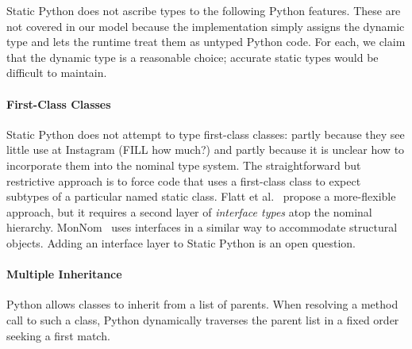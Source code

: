 \documentclass[english,cleveref,submission]{programming}
\newcommand{\SP}{Static Python}
\begin{document}
\SP{} does not ascribe types to the following Python features.
These are not covered in our model because the implementation simply
assigns the dynamic type and lets the runtime treat them as untyped
Python code.
For each, we claim that the dynamic type is a reasonable choice;
accurate static types would be difficult to maintain.


\paragraph{First-Class Classes}

\SP{} does not attempt to type first-class classes:
partly because they see little use at Instagram (FILL how much?)
and partly because it is unclear how to incorporate them into the
nominal type system.
The straightforward but restrictive approach is to force code that uses a
first-class class to expect subtypes of a particular named static class.
Flatt et al.~\cite{fkf-popl-1998} propose a more-flexible approach, %
but it requires a second layer of \emph{interface types} atop the nominal hierarchy.
MonNom~\cite{mt-oopsla-2021} uses interfaces in a similar way to accommodate
structural objects.
Adding an interface layer to \SP{} is an open question.




\paragraph{Multiple Inheritance}


Python allows classes to inherit from a list of parents.
When resolving a method call to such a class, Python
dynamically traverses the parent list in a fixed order
seeking a first match.
\end{document}
